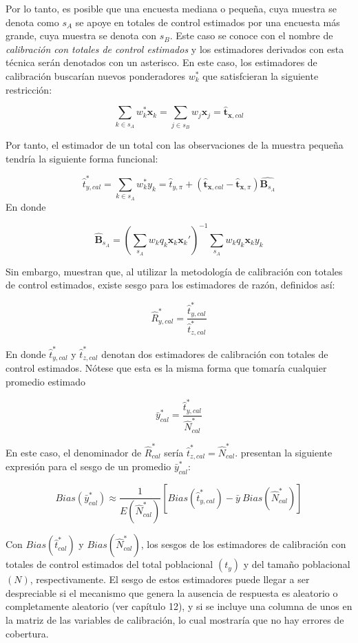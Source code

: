 \documentclass[
  12pt,
]{book}
\begin{document}
Por lo tanto, es posible que una encuesta mediana o pequeña, cuya muestra se denota como \(s_A\) se apoye en totales de control estimados por una encuesta más grande, cuya muestra se denota con \(s_B\). Este caso se conoce con el nombre de \emph{calibración con totales de control estimados} \citep{Dever2008} y los estimadores derivados con esta técnica serán denotados con un asterisco. En este caso, los estimadores de calibración buscarían nuevos ponderadores \(w_k^*\) que satisfcieran la siguiente restricción:

\[
\sum_{k\in s_A}w_k^*\mathbf{x}_k =  \sum_{j\in s_B}w_j\mathbf{x}_j = \hat{\mathbf{t}}_{\mathbf{x}, cal}
\]

Por tanto, el estimador de un total con las observaciones de la muestra pequeña tendría la siguiente forma funcional:

\[
\hat{t}_{y, cal}^* 
= \sum_{k\in s_A} w_k^* y_k 
= \hat{t}_{y, \pi} + ( \hat{\mathbf{t}}_{\mathbf{x}, cal} - \hat{\mathbf{t}}_{\mathbf{x}, \pi}) \hat{\mathbf{B}_{s_A}}
\]
En donde

\[
\hat{\mathbf{B}}_{s_A} = \left(\sum_{s_A} w_k q_k \mathbf{x}_k\mathbf{x}_k'\right)^{-1}\sum_{s_A} w_k q_k \mathbf{x}_k y_k
\]

Sin embargo, \citet{Dever_Valliant_2016} muestran que, al utilizar la metodología de calibración con totales de control estimados, existe sesgo para los estimadores de razón, definidos así:

\[
\hat{R}^*_{y, cal} = \frac{\hat{t}_{y, cal}^*}{\hat{t}_{z, cal}^*}
\]

En donde \(\hat{t}_{y, cal}^*\) y \(\hat{t}_{z, cal}^*\) denotan dos estimadores de calibración con totales de control estimados. Nótese que esta es la misma forma que tomaría cualquier promedio estimado

\[
\bar y ^{*}_{cal} = \frac{\hat{t}_{y, cal}^{*}}{\hat{N}^{*}_{cal}}
\]

En este caso, el denominador de \(\hat{R}^{*}_{cal}\) sería \(\hat{t}_{z,cal}^{*} = \hat N^{*}_{cal}\). \citet{Dever_Valliant_2016} presentan la siguiente expresión para el sesgo de un promedio \(\bar y ^{*}_{cal}\):

\[
Bias(\bar y ^{*}_{cal})
\approx
\frac{1}{E(\hat N^{*}_{cal})} 
\left[ Bias(\hat{t}_{y,cal}^{*}) - \bar{y} \ Bias(\hat{N}^{*}_{cal})\right]
\]

Con \(Bias(\hat{t}_{cal}^{*})\) y \(Bias(\hat{N}^{*}_{cal})\), los sesgos de los estimadores de calibración con totales de control estimados del total poblacional \((t_y)\) y del tamaño poblacional \((N)\), respectivamente. El sesgo de estos estimadores puede llegar a ser despreciable si el mecanismo que genera la ausencia de respuesta es aleatorio o completamente aleatorio (ver capítulo 12), y si se incluye una columna de unos en la matriz de las variables de calibración, lo cual mostraría que no hay errores de cobertura.
\end{document}
